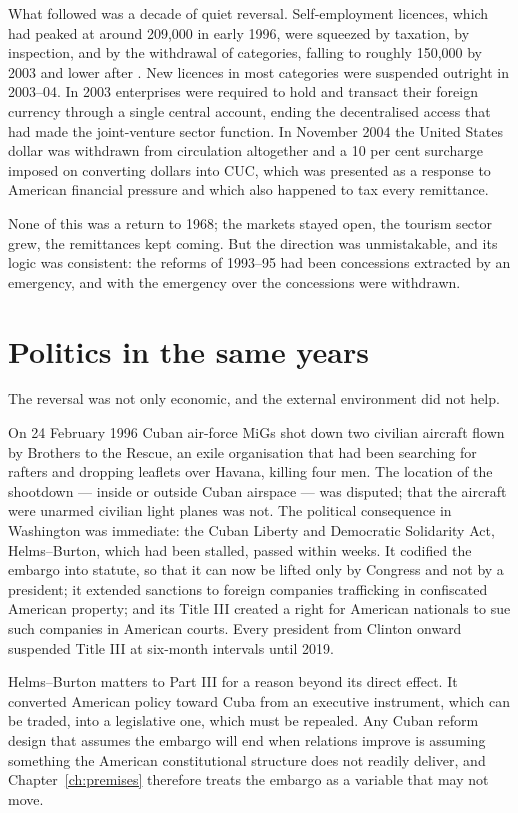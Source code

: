 What followed was a decade of quiet reversal. Self-employment licences, which
had peaked at around 209,000 in early 1996, were squeezed by taxation, by
inspection, and by the withdrawal of categories, falling to roughly 150,000 by
2003 and lower after \citep{ritter2015}.\unv{} New licences in most categories were suspended
outright in 2003--04. In 2003 enterprises were required to hold and transact
their foreign currency through a single central account, ending the
decentralised access that had made the joint-venture sector function. In
November 2004 the United States dollar was withdrawn from circulation
altogether and a 10 per cent surcharge imposed on converting dollars into CUC,
which was presented as a response to American financial pressure and which also
happened to tax every remittance.

None of this was a return to 1968; the markets stayed open, the tourism sector
grew, the remittances kept coming. But the direction was unmistakable, and its
logic was consistent: the reforms of 1993--95 had been concessions extracted by
an emergency, and with the emergency over the concessions were withdrawn.

\section{Politics in the same years}

The reversal was not only economic, and the external environment did not help.

On 24 February 1996 Cuban air-force MiGs shot down two civilian aircraft flown
by Brothers to the Rescue, an exile organisation that had been searching for
rafters and dropping leaflets over Havana, killing four men. The location of the
shootdown --- inside or outside Cuban airspace --- was disputed; that the
aircraft were unarmed civilian light planes was not. The political consequence
in Washington was immediate: the Cuban Liberty and Democratic Solidarity Act,
Helms--Burton, which had been stalled, passed within weeks. It codified the
embargo into statute, so that it can now be lifted only by Congress and not by a
president; it extended sanctions to foreign companies trafficking in confiscated
American property; and its Title III created a right for American nationals to
sue such companies in American courts. Every president from Clinton onward
suspended Title III at six-month intervals until 2019.

Helms--Burton matters to Part III for a reason beyond its direct effect. It
converted American policy toward Cuba from an executive instrument, which can be
traded, into a legislative one, which must be repealed. Any Cuban reform design
that assumes the embargo will end when relations improve is assuming something
the American constitutional structure does not readily deliver, and
Chapter~\ref{ch:premises} therefore treats the embargo as a variable that may
not move.

